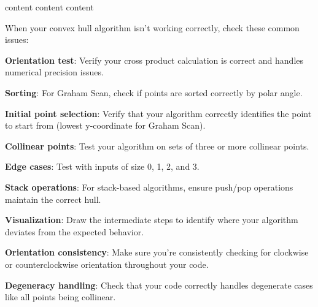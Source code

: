 {content}
{content}
{content} 

When your convex hull algorithm isn't working correctly, check these common issues:
\begin{debugchecklist}
\item \textbf{Orientation test}: Verify your cross product calculation is correct and handles numerical precision issues.
\item \textbf{Sorting}: For Graham Scan, check if points are sorted correctly by polar angle.
\item \textbf{Initial point selection}: Verify that your algorithm correctly identifies the point to start from (lowest y-coordinate for Graham Scan).
\item \textbf{Collinear points}: Test your algorithm on sets of three or more collinear points.
\item \textbf{Edge cases}: Test with inputs of size 0, 1, 2, and 3.
\item \textbf{Stack operations}: For stack-based algorithms, ensure push/pop operations maintain the correct hull.
\item \textbf{Visualization}: Draw the intermediate steps to identify where your algorithm deviates from the expected behavior.
\item \textbf{Orientation consistency}: Make sure you're consistently checking for clockwise or counterclockwise orientation throughout your code.
\item \textbf{Degeneracy handling}: Check that your code correctly handles degenerate cases like all points being collinear.
\end{debugchecklist}
